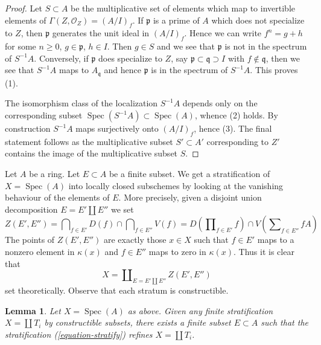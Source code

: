 \documentclass[10pt,a4paper]{article}
\theoremstyle{plain}
\newtheorem{lemma}[subsection]{Lemma}
\theoremstyle{definition}
\theoremstyle{remark}
\numberwithin{equation}{subsection}
\def\Spec{\mathop{\mathrm{Spec}}}
\begin{document}
\begin{proof}
Let $S \subset A$ be the multiplicative set of elements which map
to invertible elements of $\Gamma(Z, \mathcal{O}_Z) = (A/I)_f$.
If $\mathfrak p$ is a prime of $A$ which does not specialize to $Z$,
then $\mathfrak p$ generates the unit ideal in $(A/I)_f$. Hence
we can write $f^n =  g + h$ for some $n \geq 0$, $g \in \mathfrak p$,
$h \in I$. Then $g \in S$ and we see that $\mathfrak p$ is not in
the spectrum of $S^{-1}A$. Conversely, if $\mathfrak p$ does specialize
to $Z$, say $\mathfrak p \subset \mathfrak q \supset I$ with
$f \not \in \mathfrak q$, then we see that $S^{-1}A$ maps to
$A_\mathfrak q$ and hence $\mathfrak p$ is in the spectrum of $S^{-1}A$.
This proves (1).

\medskip\noindent
The isomorphism class of the localization $S^{-1}A$ depends only
on the corresponding subset $\Spec(S^{-1}A) \subset \Spec(A)$, whence
(2) holds. By construction $S^{-1}A$ maps surjectively onto
$(A/I)_f$, hence (3). The final statement follows as the multiplicative subset
$S' \subset A'$ corresponding to $Z'$ contains the image of the
multiplicative subset $S$.
\end{proof}

\noindent
Let $A$ be a ring. Let $E \subset A$ be a finite subset. We get a
stratification of $X = \Spec(A)$ into locally closed subschemes by
looking at the vanishing behaviour of the elements of $E$. More precisely,
given a disjoint union decomposition $E = E' \amalg E''$ we set
\begin{equation}
\label{equation-stratum}
Z(E', E'') =
\bigcap\nolimits_{f \in E'} D(f) \cap \bigcap\nolimits_{f \in E''} V(f) =
D(\prod\nolimits_{f \in E'} f) \cap V( \sum\nolimits_{f \in E''} fA)
\end{equation}
The points of $Z(E', E'')$ are exactly those $x \in X$ such that
$f \in E'$ maps to a nonzero element in $\kappa(x)$ and $f \in E''$
maps to zero in $\kappa(x)$. Thus it is clear that
\begin{equation}
\label{equation-stratify}
X = \coprod\nolimits_{E = E' \amalg E''} Z(E', E'')
\end{equation}
set theoretically. Observe that each stratum is constructible.

\begin{lemma}
\label{lemma-refine}
Let $X = \Spec(A)$ as above. Given any finite stratification
$X = \coprod T_i$ by constructible subsets, there exists a finite
subset $E \subset A$ such that the stratification (\ref{equation-stratify})
refines $X = \coprod T_i$.
\end{lemma}
\end{document}
